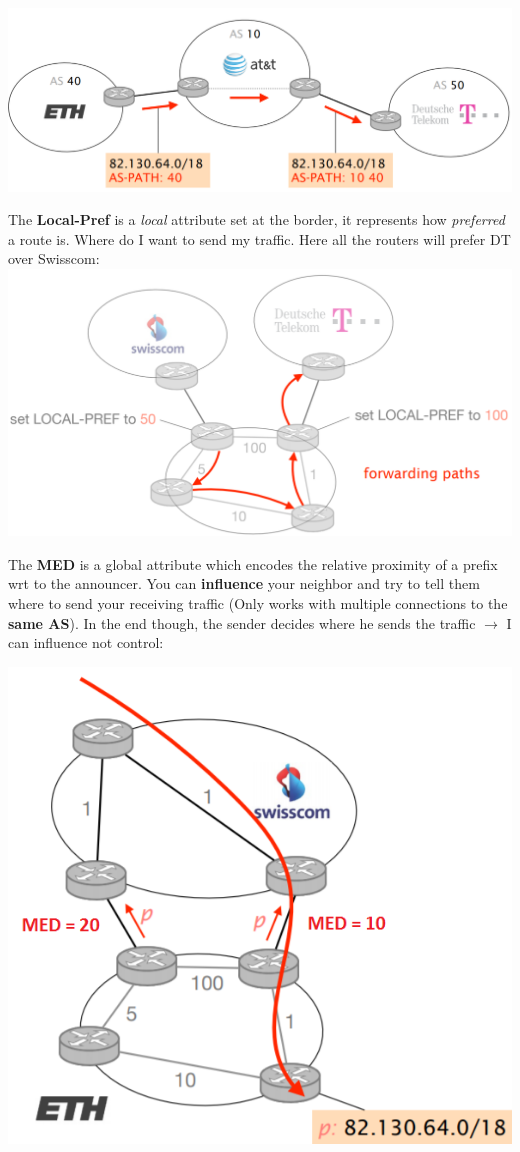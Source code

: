 \documentclass[a4paper, fontsize=8pt, landscape, DIV=1]{scrartcl}
\begin{document}
\begin{multicols*}{4}
		\includegraphics[width=\columnwidth]{images/Network_Layer/as_path.png}
		\par
		\vspace{0.5cm} 
		The \textbf{Local-Pref} is a \textit{local} attribute set at the border, it
		represents how \textit{preferred} a route is. Where do I want to send my
		traffic. Here all the routers will prefer DT over Swisscom:\\
		\includegraphics[width=\columnwidth]{images/Network_Layer/local_pref.png}
		\par 
		The \textbf{MED} is a global attribute which encodes the relative proximity of
		a prefix wrt to the announcer. You can \textbf{influence} your neighbor and try
		to tell them where to send your receiving traffic (Only works with multiple
		connections to the \textbf{same AS}). In the end though, the sender decides
		where he sends the traffic $\rightarrow$ I can influence not control:\\
		\begin{center}
			\includegraphics[width=0.7\columnwidth]{images/Network_Layer/med.png}

\end{center}
\end{multicols*}
\end{document}
